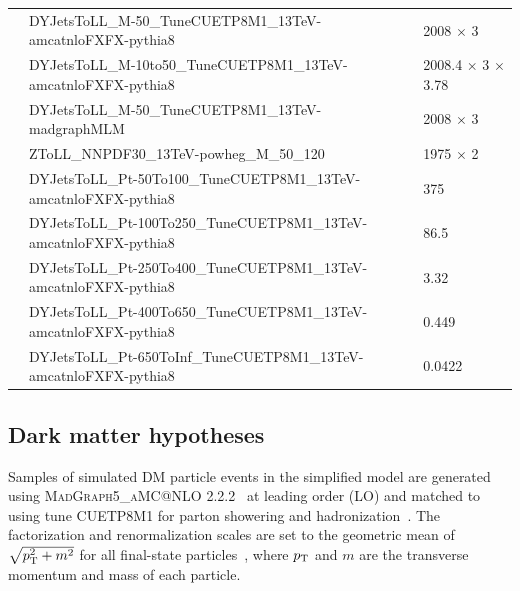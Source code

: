 \begin{table}
\begin{center}
{\begin{tabular}{|p{3.0cm}|p{13cm}|p{3.5cm}|}
       & DYJetsToLL\_M-50\_TuneCUETP8M1\_13TeV-amcatnloFXFX-pythia8         & 2008 $\times$ 3 \\ 
       & DYJetsToLL\_M-10to50\_TuneCUETP8M1\_13TeV-amcatnloFXFX-pythia8 & 2008.4 $\times$ 3 $\times$ 3.78 \\ 
       & DYJetsToLL\_M-50\_TuneCUETP8M1\_13TeV-madgraphMLM                  & 2008 $\times$ 3 \\ 
       & ZToLL\_NNPDF30\_13TeV-powheg\_M\_50\_120                           & 1975 $\times$ 2 \\ 
       & DYJetsToLL\_Pt-50To100\_TuneCUETP8M1\_13TeV-amcatnloFXFX-pythia8   & 375             \\ 
       & DYJetsToLL\_Pt-100To250\_TuneCUETP8M1\_13TeV-amcatnloFXFX-pythia8  & 86.5            \\ 
       & DYJetsToLL\_Pt-250To400\_TuneCUETP8M1\_13TeV-amcatnloFXFX-pythia8  & 3.32            \\ 
       & DYJetsToLL\_Pt-400To650\_TuneCUETP8M1\_13TeV-amcatnloFXFX-pythia8  & 0.449           \\ 
       & DYJetsToLL\_Pt-650ToInf\_TuneCUETP8M1\_13TeV-amcatnloFXFX-pythia8  & 0.0422          \\ 
       \hline 

         \end{tabular}
         }
           \end{center}
           \end{table}

\subsection{Dark matter hypotheses}
Samples of simulated DM particle events in the simplified model are generated using \textsc{MadGraph5\_aMC@NLO 2.2.2}~\cite{Alwall:2014hca} at leading order (LO) and matched to
~\cite{Sjostrand:2007gs} using tune CUETP8M1 for parton showering and hadronization~\cite{Khachatryan:2015pea,Skands:2014pea}.
The factorization and re\-nor\-ma\-li\-zat\-ion scales are set to the geometric mean of $\sqrt{p_{\mathrm{T}}^2+m^2}$ for all final-state particles~\cite{Alwall:2014hca,Abercrombie:2015wmb}, where $p_{\mathrm{T}}$ and $m$ are the transverse momentum and mass of each particle.

